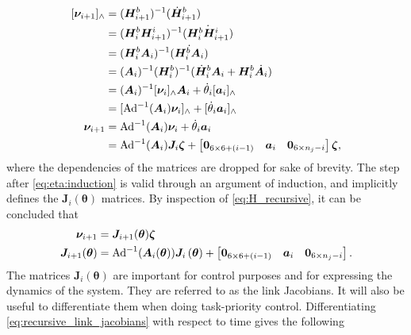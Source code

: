 \begin{subequations}
    \label{eq:H_recursive}
\begin{align}
    [\bm{\nu}_{i+1}]_{\wedge} &= (\bm{H}_{i+1}^b)^{-1}(\dot{\bm{H}}_{i+1}^b) \\
    &= (\bm{H}_{i}^b\bm{H}_{i+1}^i)^{-1}(\dot{\bm{H}_{i}^b\bm{H}_{i+1}^i}) \\
    &= (\bm{H}_{i}^b\bm{A}_i)^{-1}(\dot{\bm{H}_{i}^b\bm{A}_i}) \\
    &= (\bm{A}_i)^{-1}(\bm{H}_{i}^b)^{-1}(\dot{\bm{H}}_{i}^b\bm{A}_i + \bm{H}_{i}^b\dot{\bm{A}}_i) \\
    &= (\bm{A}_i)^{-1}[\bm{\nu}_i]_{\wedge}\bm{A}_i + \dot{\theta}_i[\bm{a}_i]_{\wedge} \\
    &= [\operatorname{Ad}^{-1}(\bm{A}_i)\bm{\nu}_i]_{\wedge} + [\dot{\theta}_i\bm{a}_i]_{\wedge} \label{eq:eta:induction}\\
    \bm{\nu}_{i+1} &= \operatorname{Ad}^{-1}(\bm{A}_i)\bm{\nu}_i + \dot{\theta}_i\bm{a}_i \\
    &= \operatorname{Ad}^{-1}(\bm{A}_i)\bm{J}_i\bm{\zeta} + \begin{bmatrix}\bm{0}_{6\times6+(i-1)} & \bm{a}_i & \bm{0}_{6\times n_j-i}\end{bmatrix}\bm{\zeta},
\end{align}
\end{subequations}
where the dependencies of the matrices are dropped for sake of brevity.
The step after \autoref{eq:eta:induction} is valid through an argument of induction, and
implicitly defines the $\bm{J}_i(\bm{\theta})$ matrices.
By inspection of \autoref{eq:H_recursive}, it can be concluded that
\begin{subequations}
\label{eq:recursive_link_jacobians}
\begin{align}
    \bm{\nu}_{i+1} &= \bm{J}_{i+1}(\bm{\theta}) \bm{\zeta} \\
    \bm{J}_{i+1}(\bm{\theta}) &= 
    \operatorname{Ad}^{-1}(\bm{A}_i(\bm{\theta}))\bm{J}_i\left(\bm{\theta}\right) + \begin{bmatrix}\bm{0}_{6\times6+(i-1)} & \bm{a}_i & \bm{0}_{6\times n_j-i}\end{bmatrix}.
\end{align}
\end{subequations}
The matrices $\bm{J}_i(\bm{\theta})$ are important for control purposes and for expressing the 
dynamics of the system. They are referred to as the link Jacobians. It will also 
be useful to differentiate them when doing task-priority control. Differentiating
\autoref{eq:recursive_link_jacobians} with respect to time gives the following
